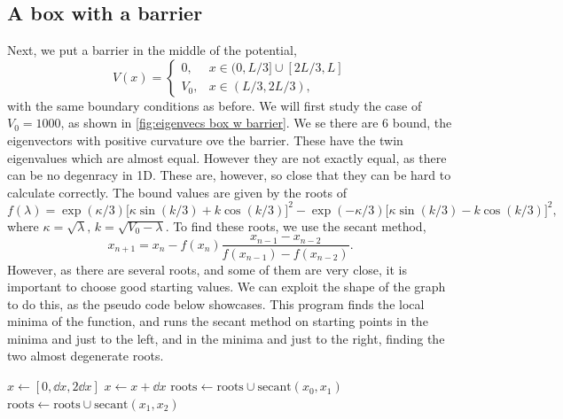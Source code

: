 \documentclass{article}
\begin{document}
\subsection*{A box with a barrier}
    Next, we put a barrier in the middle of the potential,
    \begin{equation*}
        V(x) = 
        \begin{cases}
            0, & x \in (0, L/3] \cup [2L/3, L] \\
            V_0, & x \in (L/3, 2L/3),
        \end{cases}
    \end{equation*}
    with the same boundary conditions as before. We will first study the case of $V_0 = 1000$, as shown in \ref{fig:eigenvecs box w barrier}. We se there are 6 bound, the eigenvectors with positive curvature ove the barrier. These have the twin eigenvalues which are almost equal. However they are not exactly equal, as there can be no degenracy in 1D. These are, however, so close that they can be hard to calculate correctly. The bound values are given by the roots of
    \begin{equation*}
        f(\lambda) = \exp(\kappa/3)\bigg[\kappa \sin(k/3)+k \cos(k/3)\bigg]^2 - \exp(-\kappa/3)\bigg[\kappa \sin(k/3) - k \cos(k/3)\bigg]^2,
    \end{equation*}
    where $\kappa = \sqrt{\lambda}, \, k = \sqrt{V_0 - \lambda}$. To find these roots, we use the secant method, 
    \begin{equation*}
        x_{n+1} = x_{n} - f(x_{n}) \frac{x_{n-1} - x_{n-2}}{f(x_{n-1}) - f(x_{n-2})}.
    \end{equation*}
    However, as there are several roots, and some of them are very close, it is important to choose good starting values. We can exploit the shape of the graph to do this, as the pseudo code below showcases. This program finds the local minima of the function, and runs the secant method on starting points in the minima and just to the left, and in the minima and just to the right, finding the two almost degenerate roots.

    \begin{algorithmic}
    \vspace{0.5cm}
    \State $x \gets [0, \dd x, 2 \dd x]$
            \State $x \gets x + \dd{x}$
        \EndWhile
        \State $\mathrm{roots} \gets \mathrm{roots} \cup \mathrm{secant}(x_0, x_1)$
        \State $\mathrm{roots} \gets \mathrm{roots} \cup \mathrm{secant}(x_1, x_2)$
    \EndWhile
    \end{algorithmic}
\end{document}
